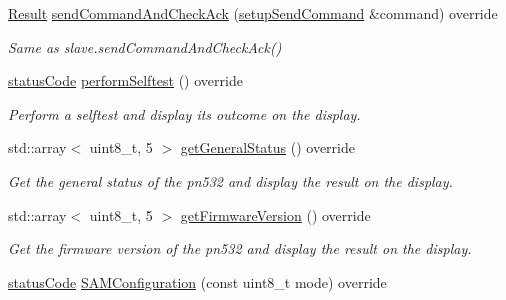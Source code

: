 \begin{DoxyCompactItemize}
\mbox{\label{classnfc_1_1NfcOled_afcd62a218b26b6d7a59eb27fdc7b1c78}} 
\hyperlink{structnfc_1_1Result}{Result} \hyperlink{classnfc_1_1NfcOled_afcd62a218b26b6d7a59eb27fdc7b1c78}{send\+Command\+And\+Check\+Ack} (\hyperlink{classsetupSendCommand}{setup\+Send\+Command} \&command) override
\begin{DoxyCompactList}\small\item\em Same as slave.\+send\+Command\+And\+Check\+Ack() \end{DoxyCompactList}\item 
\mbox{\label{classnfc_1_1NfcOled_a76e1f57a8cf76b22029df6da4d8bacd2}} 
\hyperlink{declarations_8h_ae1d20c5a38cae82ccaa6a77be3fd264b}{status\+Code} \hyperlink{classnfc_1_1NfcOled_a76e1f57a8cf76b22029df6da4d8bacd2}{perform\+Selftest} () override
\begin{DoxyCompactList}\small\item\em Perform a selftest and display it\textquotesingle{}s outcome on the display. \end{DoxyCompactList}\item 
\mbox{\label{classnfc_1_1NfcOled_a037638d75c50a76c7f62d0e69cb44cdb}} 
std\+::array$<$ uint8\+\_\+t, 5 $>$ \hyperlink{classnfc_1_1NfcOled_a037638d75c50a76c7f62d0e69cb44cdb}{get\+General\+Status} () override
\begin{DoxyCompactList}\small\item\em Get the general status of the pn532 and display the result on the display. \end{DoxyCompactList}\item 
\mbox{\label{classnfc_1_1NfcOled_add83fefdd3a5eadc6f85617173d08336}} 
std\+::array$<$ uint8\+\_\+t, 5 $>$ \hyperlink{classnfc_1_1NfcOled_add83fefdd3a5eadc6f85617173d08336}{get\+Firmware\+Version} () override
\begin{DoxyCompactList}\small\item\em Get the firmware version of the pn532 and display the result on the display. \end{DoxyCompactList}\item 
\mbox{\label{classnfc_1_1NfcOled_a1779648dbd03771141b98ac604ba7982}} 
\hyperlink{declarations_8h_ae1d20c5a38cae82ccaa6a77be3fd264b}{status\+Code} \hyperlink{classnfc_1_1NfcOled_a1779648dbd03771141b98ac604ba7982}{S\+A\+M\+Configuration} (const uint8\+\_\+t mode) override

\end{DoxyCompactItemize}
